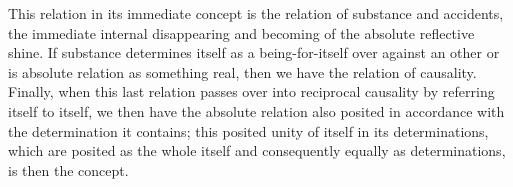 This relation in its immediate concept is
the relation of substance and accidents,
the immediate internal disappearing and becoming
of the absolute reflective shine.
If substance determines itself as a being-for-itself over
against an other or is absolute relation as something real,
then we have the relation of causality.
Finally, when this last relation passes over into
reciprocal causality by referring itself to itself,
we then have the absolute relation also posited
in accordance with the determination it contains;
this posited unity of itself in its determinations,
which are posited as the whole itself
and consequently equally as determinations,
is then the concept.
